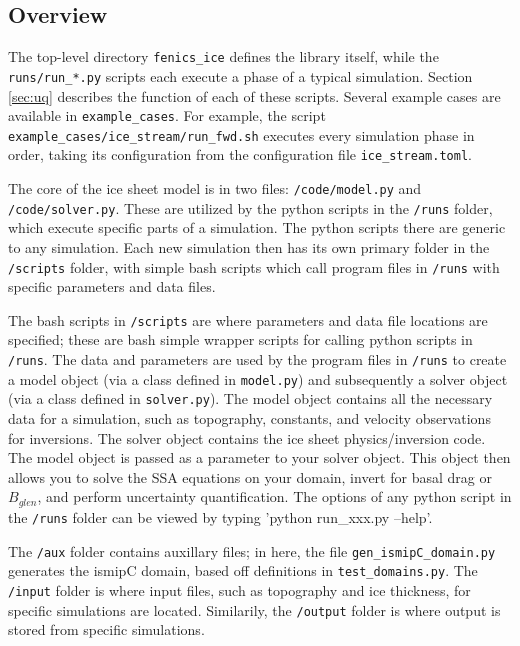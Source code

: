 \documentclass[11pt, reqno, nocenter]{article}
\begin{document}
\subsection{Overview}

The top-level directory {\tt fenics\_ice} defines the library itself, while the {\tt runs/run\_*.py} scripts each execute a phase of a typical simulation. Section \ref{sec:uq} describes the function of each of these scripts. Several example cases are available in {\tt example\_cases}. For example, the script {\tt example\_cases/ice\_stream/run\_fwd.sh} executes every simulation phase in order, taking its configuration from the configuration file {\tt ice\_stream.toml}.

The core of the ice sheet model is in two files: {\tt /code/model.py} and {\tt /code/solver.py}. These are utilized by the python scripts in the {\tt /runs} folder, which execute specific parts of a simulation. The python scripts there are generic to any simulation. Each new simulation then has its own primary folder in the {\tt /scripts} folder, with simple bash scripts which call program files in {\tt /runs} with specific parameters and data files.

The bash scripts in {\tt /scripts} are where parameters and data file locations are specified; these are bash simple wrapper scripts for calling python scripts in {\tt /runs}. The data and parameters are used by the program files in {\tt /runs} to create a model object (via a class defined in {\tt model.py}) and subsequently a solver object (via a class defined in {\tt solver.py}). The model object contains all the necessary data for a simulation, such as topography, constants, and velocity observations for inversions. The solver object contains the ice sheet physics/inversion code. The model object is passed as a parameter to your solver object. This object then allows you to solve the SSA equations \cite{MacAyeal1989} on your domain, invert for basal drag or $B_{glen}$, and perform uncertainty quantification. The options of any python script in the {\tt /runs} folder can be viewed by typing 'python run\_xxx.py --help'.


The {\tt /aux} folder contains auxillary files; in here, the file {\tt gen\_ismipC\_domain.py} generates the ismipC domain,  based off definitions in {\tt test\_domains.py}. The {\tt /input} folder is where input files, such as topography and ice thickness, for specific simulations are located. Similarily, the {\tt /output} folder is where output is stored from specific simulations.
\end{document}
